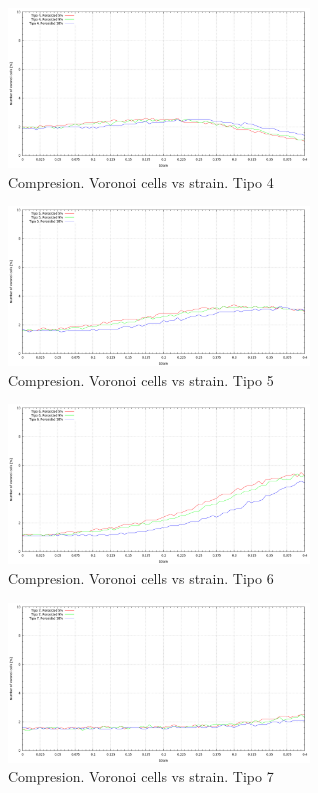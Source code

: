 \documentclass[10pt, oneside]{article} %
\begin{document}
\begin{figure}[H]
\centering
\includegraphics[width=8cm]{Figures/Porosidad/Porosidad_noVoronoi_strain_tipo4_comp.png}
\caption{Compresion. Voronoi cells vs strain. Tipo 4}
\end{figure}

\begin{figure}[H]
\centering
\includegraphics[width=8cm]{Figures/Porosidad/Porosidad_noVoronoi_strain_tipo5_comp.png}
\caption{Compresion. Voronoi cells vs strain. Tipo 5}
\end{figure}

\begin{figure}[H]
\centering
\includegraphics[width=8cm]{Figures/Porosidad/Porosidad_noVoronoi_strain_tipo6_comp.png}
\caption{Compresion. Voronoi cells vs strain. Tipo 6}
\end{figure}

\begin{figure}[H]
\centering
\includegraphics[width=8cm]{Figures/Porosidad/Porosidad_noVoronoi_strain_tipo7_comp.png}
\caption{Compresion. Voronoi cells vs strain. Tipo 7}
\end{figure}
\end{document}
